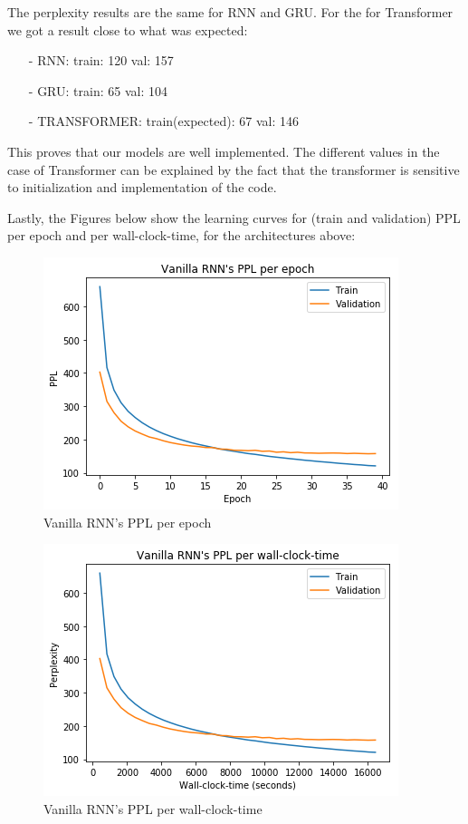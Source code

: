 The perplexity results are the same for RNN and GRU. For the for Transformer we got a result close to what was expected:
\begin{itemize}
	\item[-] RNN: train:  120  val: 157
	\item[-] GRU: train:   65  val: 104
	\item[-] TRANSFORMER:  train(expected):  67  val: 146
\end{itemize}

This proves that our models are well implemented. The different values in the case of Transformer can be explained by the fact that the transformer is sensitive to initialization and implementation of the code. 

Lastly, the Figures below show the learning curves for (train and validation) PPL per epoch and per wall-clock-time, for the architectures above:

\begin{figure}[H]
	\centering
	\includegraphics[scale=0.8]{Q4-1_RNN_epoch.png}
	\caption{Vanilla RNN's PPL per epoch}
	\label{fig:fig1}
\end{figure}

\begin{figure}[H]
	\centering
	\includegraphics[scale=0.8]{Q4-1_RNN_clock.png}
	\caption{Vanilla RNN's PPL per wall-clock-time}
	\label{fig:fig2}
\end{figure}

